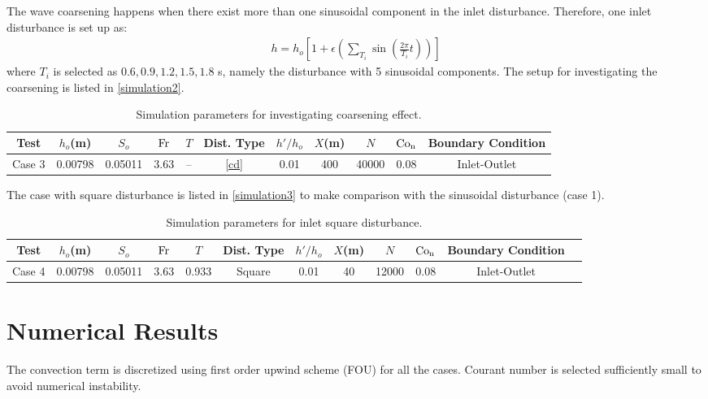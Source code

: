 \documentclass[a4paper]{article}
\newcommand{\fr}{\rm{Fr}}
\begin{document}
The wave coarsening happens when there exist more than one sinusoidal component in the inlet disturbance. Therefore, one inlet disturbance is set up as:
\begin{equation}
\label{cd}
\begin{split}
h=h_o[1+\epsilon(\sum_{T_i}\sin(\frac{2\pi}{T_i}  t))]
\end{split}
\end{equation}
where $T_i$ is selected as $0.6,0.9,1.2,1.5,1.8$ s, namely the disturbance with 5 sinusoidal components. The setup for investigating the coarsening   is listed in \autoref{simulation2}.
\begin{table}[htbp]
	\centering
	\caption{Simulation parameters for investigating coarsening effect.}
	\label{simulation2}
	\begin{threeparttable}
		\begin{tabular}{ccccccccccc}
			\toprule
			Test & $h_o$(m) & $S_o$ & $\fr$ & $T$ & Dist. Type & $h'/h_o$ & $X$(m) &$N$&$\rm{Co_n}$&Boundary Condition \\
			\midrule
			Case 3  & 0.00798 & 0.05011 & 3.63 & -- &\autoref{cd} & 0.01 & 400 &40000&0.08&Inlet-Outlet\\
			\bottomrule    
		\end{tabular}

	\end{threeparttable}
\end{table}

The case with square disturbance is listed in \autoref{simulation3} to make comparison with the sinusoidal disturbance (case 1).
\begin{table}[htbp]
	\centering
	\caption{Simulation parameters for inlet square disturbance.}
	\label{simulation3}
	\begin{threeparttable}
		\begin{tabular}{cccccccccccc}
			\toprule
			Test & $h_o$(m) & $S_o$ & $\fr$ & $T$ & Dist. Type & $h'/h_o$ & $X$(m) &$N$&$\rm{Co_n}$&Boundary Condition\\
			\midrule
			Case 4  & 0.00798 & 0.05011 & 3.63 & 0.933 &Square & 0.01 & 40 &12000&0.08&Inlet-Outlet\\
			\bottomrule    
		\end{tabular}

	\end{threeparttable}
\end{table}

\section{Numerical Results}
The convection term is discretized using first order upwind scheme (FOU) for all the cases. Courant number is selected sufficiently small to avoid numerical instability.
\end{document}
